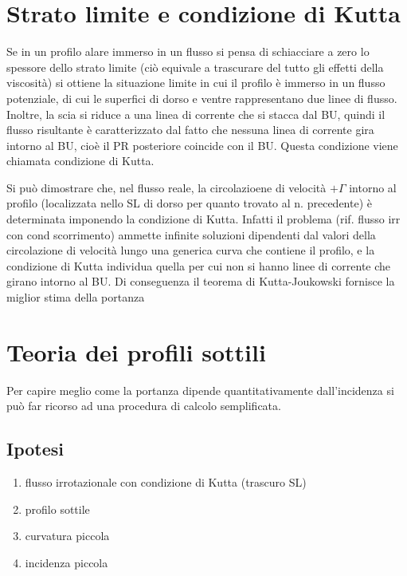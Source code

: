 \documentclass[11pt,a4paper]{report}
\begin{document}
	
	\section{Strato limite e condizione di Kutta}
	Se in un profilo alare immerso in un flusso si pensa di schiacciare a zero lo spessore dello strato limite (ciò equivale a trascurare del tutto gli effetti della viscosità) si ottiene la situazione limite in cui il profilo è immerso in un flusso potenziale, di cui le superfici di dorso e ventre rappresentano due linee di flusso. Inoltre, la scia si riduce a una linea di corrente che si stacca dal BU, quindi il flusso risultante è caratterizzato dal fatto che nessuna linea di corrente gira intorno al BU, cioè il PR posteriore coincide con il BU. Questa condizione viene chiamata condizione di Kutta.
	
	Si può dimostrare che, nel flusso reale, la circolazioene di velocità $+\Gamma$ intorno al profilo (localizzata nello SL di dorso per quanto trovato al n. precedente) è determinata imponendo la condizione di Kutta. Infatti il problema (rif. flusso irr con cond scorrimento) ammette infinite soluzioni dipendenti dal valori della circolazione di velocità lungo una generica curva che contiene il profilo, e la condizione di Kutta individua quella per cui non si hanno linee di corrente che girano intorno al BU. Di conseguenza il teorema di Kutta-Joukowski fornisce la miglior stima della portanza 
	
	\section{Teoria dei profili sottili}
	Per capire meglio come la portanza dipende quantitativamente dall'incidenza si può far ricorso ad una procedura di calcolo semplificata.
		\subsection{Ipotesi}	\label{prof sott}
		\begin{enumerate}[nosep]
			\item{flusso irrotazionale con condizione di Kutta (trascuro SL)}
			\item{profilo sottile}
			\item{curvatura piccola}
			\item{incidenza piccola}
		\end{enumerate}
\end{document}
